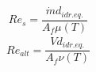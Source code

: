 \documentclass[a4paper,10pt]{article}                                                                                       %
\begin{document}
\vspace{3mm}                                                                                                                %
\begin{equation}                                                                                                            %
  Re_s = \frac{\dot{m}d_{idr.eq.}}{A_f\mu(T)}                                                                               %
  \label{eqn:re_shell}                                                                                                      %
\end{equation}                                                                                                              %
\vspace{3mm}                                                                                                                %
\begin{equation}                                                                                                            %
  Re_{alt} = \frac{\dot{V}d_{idr.eq.}}{A_f\nu(T)}                                                                           %
  \label{eqn:re_alt}                                                                                                        %
\end{equation}                                                                                                              %
\vspace{3mm}                                                                                                                %
\end{document}
